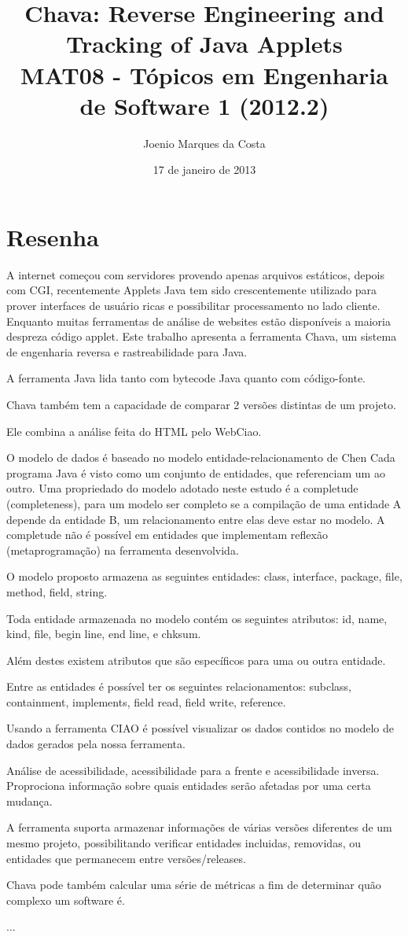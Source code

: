 \documentclass[12pt]{article}
\title{Chava: Reverse Engineering and Tracking of Java Applets
 \cite{Chava} \\
 \large MAT08 - Tópicos em Engenharia de Software 1 (2012.2)}
\author{Joenio Marques da Costa}
\date{17 de janeiro de 2013}
\begin{document}
\maketitle

\section*{Resenha}

A internet começou com servidores provendo apenas arquivos estáticos, depois
com CGI, recentemente Applets Java tem sido crescentemente utilizado para
prover interfaces de usuário ricas e possibilitar processamento no lado
cliente. Enquanto muitas ferramentas de análise de websites estão disponíveis
a maioria despreza código applet. Este trabalho apresenta a ferramenta
Chava, um sistema de engenharia reversa e rastreabilidade para Java.

A ferramenta Java lida tanto com bytecode Java quanto com código-fonte.

Chava também tem a capacidade de comparar 2 versões distintas de um projeto.

Ele combina a análise feita do HTML pelo WebCiao.

O modelo de dados é baseado no modelo entidade-relacionamento de Chen
Cada programa Java é visto como um conjunto de entidades, que referenciam
um ao outro. Uma propriedado do modelo adotado neste estudo é a completude
(completeness), para um modelo ser completo se a compilação de uma entidade
A depende da entidade B, um relacionamento entre elas deve estar no modelo.
A completude não é possível em entidades que implementam reflexão
(metaprogramação) na ferramenta desenvolvida.\cite{DesignSuite}

O modelo proposto armazena as seguintes entidades:
class, interface, package, file, method, field, string.

Toda entidade armazenada no modelo contém os seguintes atributos:
id, name, kind, file, begin line, end line, e chksum.

Além destes existem atributos que são específicos para uma ou outra
entidade.

Entre as entidades é possível ter os seguintes relacionamentos:
subclass, containment, implements, field read, field write, reference.

Usando a ferramenta CIAO é possível visualizar os dados contidos
no modelo de dados gerados pela nossa ferramenta.

Análise de acessibilidade, acessibilidade para a frente e acessibilidade inversa.
Proprociona informação sobre quais entidades serão afetadas por uma certa
mudança.

A ferramenta suporta armazenar informações de várias versões diferentes
de um mesmo projeto, possibilitando verificar entidades incluidas, removidas,
ou entidades que permanecem entre versões/releases.

Chava pode também calcular uma série de métricas a fim de determinar
quão complexo um software é.

...


\end{document}
